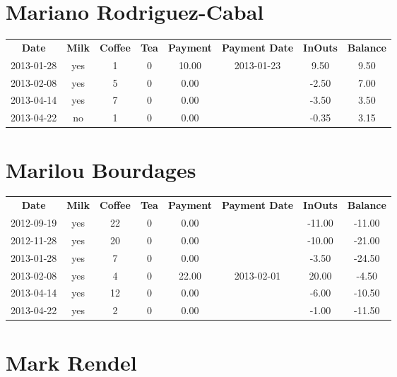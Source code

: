 \section{Mariano Rodriguez-Cabal}

\begin{center}
\begin{tabular}{cccccccc}
\textbf{Date} & \textbf{Milk} & \textbf{Coffee} & \textbf{Tea} & \textbf{Payment} & \textbf{Payment Date} & \textbf{InOuts} & \textbf{Balance} \\
2013-01-28 & yes & 1 & 0 & 10.00 & 2013-01-23 &  9.50 & 9.50\\ 
2013-02-08 & yes & 5 & 0 &  0.00 &  & -2.50 & 7.00\\ 
2013-04-14 & yes & 7 & 0 &  0.00 &  & -3.50 & 3.50\\ 
2013-04-22 & no & 1 & 0 &  0.00 &  & -0.35 & 3.15
\end{tabular}
\end{center}

\section{Marilou Bourdages}

\begin{center}
\begin{tabular}{cccccccc}
\textbf{Date} & \textbf{Milk} & \textbf{Coffee} & \textbf{Tea} & \textbf{Payment} & \textbf{Payment Date} & \textbf{InOuts} & \textbf{Balance} \\
2012-09-19 & yes & 22 & 0 &  0.00 &  & -11.00 & -11.00\\ 
2012-11-28 & yes & 20 & 0 &  0.00 &  & -10.00 & -21.00\\ 
2013-01-28 & yes &  7 & 0 &  0.00 &  &  -3.50 & -24.50\\ 
2013-02-08 & yes &  4 & 0 & 22.00 & 2013-02-01 &  20.00 &  -4.50\\ 
2013-04-14 & yes & 12 & 0 &  0.00 &  &  -6.00 & -10.50\\ 
2013-04-22 & yes &  2 & 0 &  0.00 &  &  -1.00 & -11.50
\end{tabular}
\end{center}

\section{Mark Rendel}

